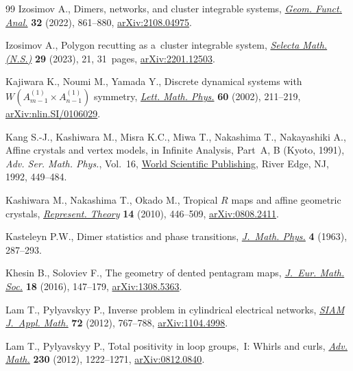\documentclass[pdftex]{sigma}
\numberwithin{equation}{section}
\begin{document}
\begin{thebibliography}{99}
Izosimov A., Dimers, networks, and cluster integrable systems,
 \href{https://doi.org/10.1007/s00039-022-00605-8}{\textit{Geom. Funct.
 Anal.}} \textbf{32} (2022), 861--880,
 \href{http://arxiv.org/abs/2108.04975}{arXiv:2108.04975}.

Izosimov A., Polygon recutting as a~cluster integrable system,
 \href{https://doi.org/10.1007/s00029-023-00826-1}{\textit{Selecta Math.
 (N.S.)}} \textbf{29} (2023), 21, 31~pages,
 \href{http://arxiv.org/abs/2201.12503}{arXiv:2201.12503}.

Kajiwara K., Noumi M., Yamada Y., Discrete dynamical systems with
 {$W(A_{m-1}^{(1)}\times A_{n-1}^{(1)})$} symmetry,
 \href{https://doi.org/10.1023/A:1016298925276}{\textit{Lett. Math. Phys.}}
 \textbf{60} (2002), 211--219,
 \href{http://arxiv.org/abs/nlin.SI/0106029}{arXiv:nlin.SI/0106029}.

Kang S.-J., Kashiwara M., Misra K.C., Miwa T., Nakashima T., Nakayashiki A.,
 Affine crystals and vertex models, in Infinite Analysis, {P}art~{A}, {B}
 ({K}yoto, 1991), \textit{Adv. Ser. Math. Phys.}, Vol.~16,
 \href{https://doi.org/10.1142/s0217751x92003896}{World Scientific Publishing},
 River Edge, NJ, 1992, 449--484.

Kashiwara M., Nakashima T., Okado M., Tropical {$R$} maps and affine geometric
 crystals,
 \href{https://doi.org/10.1090/S1088-4165-2010-00379-9}{\textit{Represent.
 Theory}} \textbf{14} (2010), 446--509,
 \href{http://arxiv.org/abs/0808.2411}{arXiv:0808.2411}.

Kasteleyn P.W., Dimer statistics and phase transitions,
 \href{https://doi.org/10.1063/1.1703953}{\textit{J.~Math. Phys.}} \textbf{4}
 (1963), 287--293.

Khesin B., Soloviev F., The geometry of dented pentagram maps,
 \href{https://doi.org/10.4171/JEMS/586}{\textit{J.~Eur. Math. Soc.}}
 \textbf{18} (2016), 147--179,
 \href{http://arxiv.org/abs/1308.5363}{arXiv:1308.5363}.

Lam T., Pylyavskyy P., Inverse problem in cylindrical electrical networks,
 \href{https://doi.org/10.1137/110846476}{\textit{SIAM J.~Appl. Math.}}
 \textbf{72} (2012), 767--788,
 \href{http://arxiv.org/abs/1104.4998}{arXiv:1104.4998}.

Lam T., Pylyavskyy P., Total positivity in loop groups,~{I}: {W}hirls and
 curls, \href{https://doi.org/10.1016/j.aim.2012.03.012}{\textit{Adv. Math.}}
 \textbf{230} (2012), 1222--1271,
 \href{http://arxiv.org/abs/0812.0840}{arXiv:0812.0840}.


\end{thebibliography}
\end{document}

